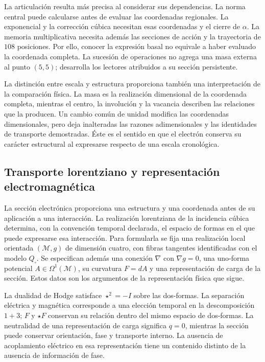 La articulación resulta más precisa al considerar sus dependencias.
La norma central puede calcularse antes de evaluar las coordenadas
regionales. La exponencial y la corrección cúbica necesitan esas
coordenadas y el cierre de \(\alpha\). La memoria multiplicativa necesita
además las secciones de acción y la trayectoria de \(108\) posiciones.
Por ello, conocer la expresión basal no equivale a haber evaluado la
coordenada completa. La sucesión de operaciones no agrega una masa
externa al punto \((5,5)\); desarrolla los lectores atribuidos a su
sección persistente.

La distinción entre escala y estructura proporciona también una
interpretación de la comparación física. La masa es la realización
dimensional de la coordenada completa, mientras el centro, la involución
y la vacancia describen las relaciones que la producen. Un cambio común
de unidad modifica las coordenadas dimensionales, pero deja inalteradas
las razones adimensionales y las identidades de transporte demostradas.
Éste es el sentido en que el electrón conserva su carácter estructural
al expresarse respecto de una escala cronológica.




\newpage
\subsection{Transporte lorentziano y representación electromagnética}

La sección electrónica proporciona una estructura y una coordenada
antes de su aplicación a una interacción. La realización lorentziana
de la incidencia cúbica determina, con la convención temporal declarada,
el espacio de formas en el que puede expresarse esa interacción.
Para formularla se fija una realización local orientada \((\mathcal M,g)\)
de dimensión cuatro, con fibras tangentes identificadas con el modelo
\(Q_\square\). Se especifican además una conexión \(\nabla\) con
\(\nabla g=0\), una uno-forma potencial \(A\in\Omega^1(\mathcal M)\),
su curvatura \(F=dA\) y una representación de carga de la sección.
Estos datos son los argumentos de la representación física que sigue.

La dualidad de Hodge satisface \(\star^2=-I\) sobre las dos-formas.
La separación eléctrica y magnética corresponde a una elección temporal
en la descomposición \(1+3\); \(F\) y \(\star F\) conservan su
relación dentro del mismo espacio de dos-formas. La neutralidad de una
representación de carga significa \(q=0\), mientras la sección puede
conservar orientación, fase y transporte interno. La ausencia de
acoplamiento eléctrico en esa representación tiene un contenido distinto
de la ausencia de información de fase.

